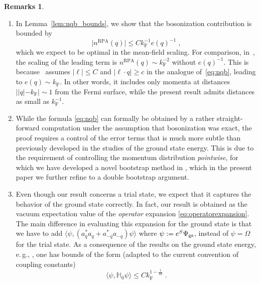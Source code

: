 \documentclass[12pt,a4paper]{article}
\numberwithin{equation}{section}
\newcommand{\1}{\mathbb{I}}
\newcommand{\F}{\mathrm{F}}
\newcommand{\RPA}{\mathrm{RPA}}
\newcommand{\kF}{k_\F}
\theoremstyle{plain}
\theoremstyle{definition}
\newtheorem*{remarks}{Remarks}
\theoremstyle{remark}
\theoremstyle{plain}
\theoremstyle{definition}
\theoremstyle{remark}
\begin{document}
\begin{remarks}
\begin{enumerate}

\item In Lemma~\ref{lem:nqb_bounds}, we show that the bosonization contribution is bounded by
\begin{equation}
	\lvert n^{\RPA}(q)\rvert \le C \kF^{-1} e(q)^{-1} \;,
\end{equation}
which we expect to be optimal in the mean-field scaling.
%
For comparison, in~\cite{BL25}, the scaling of the leading term is $ n^{\RPA}(q) \sim \kF^{-2} $ without $ e(q)^{-1} $. This is because~\cite{BL25} assumes $ |\ell| \le C $ and $ |\ell \cdot q| \ge c $ in the analogue of~\eqref{eq:nqb}, leading to $ e(q) \sim \kF $. In other words, it includes only momenta at distances $ ||q|-\kF| \sim 1 $ from the Fermi surface, while the present result admits distances as small as $ \kF^{-1} $.


\item While the formula \eqref{eq:nqb} can formally be obtained by a rather straight-forward computation under the assumption that bosonization was exact, the proof requires a control of the error terms that is much more subtle than previously developed in the studies of the ground state energy. This is due to the requirement of controlling the momentum distribution \emph{pointwise}, for which we have developed a novel bootstrap method in \cite{SL23}, which in the present paper we further refine to a double bootstrap argument.

\item Even though our result concerns a trial state, we expect that it captures the behavior of the ground state correctly. In fact, our result is obtained as the vacuum expectation value of the \emph{operator} expansion \eqref{eq:operatorexpansion}. The main difference in evaluating this expansion for the ground state is that we have to add $\langle \psi, (a^*_q a_q + a^*_{-q} a_{-q})\psi \rangle$ where $\psi := e^{S} \Psi_\textnormal{gs}$, instead of $\psi = \Omega$ for the trial state. As a consequence of the results on the ground state energy, e.\,g., \cite[Eq.~(11.9)]{BNPSS20}, one has bounds of the form (adapted to the current convention of coupling constants)
\[
	\langle \psi, \mathbb{H}_0 \psi \rangle \leq C \kF^{1- \frac{1}{48}}	\;.
\]


\end{enumerate}
\end{remarks}
\end{document}

